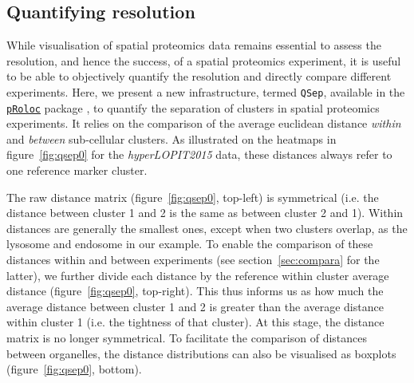 \documentclass[12pt]{article}\usepackage[]{graphicx}\usepackage[]{color}
\newcommand{\Rpackage}[1]{\texttt{#1}}
\newcommand\Biocpkg[1]{%
  {\href{http://bioconductor.org/packages/#1}%
    {\Rpackage{#1}}}}
\begin{document}
\subsection{Quantifying resolution}\label{sec:qsep}

While visualisation of spatial proteomics data remains essential to
assess the resolution, and hence the success, of a spatial proteomics
experiment, it is useful to be able to objectively quantify the
resolution and directly compare different experiments. Here, we
present a new infrastructure, termed \texttt{QSep}, available in the
\Biocpkg{pRoloc} package \citet{Gatto:2014a}, to quantify the
separation of clusters in spatial proteomics experiments. It relies on
the comparison of the average euclidean distance \textit{within} and
\textit{between} sub-cellular clusters. As illustrated on the heatmaps
in figure~\ref{fig:qsep0} for the \textit{hyperLOPIT2015} data, these
distances always refer to one reference marker cluster.

The raw distance matrix (figure~\ref{fig:qsep0}, top-left) is
symmetrical (i.e. the distance between cluster 1 and 2 is the same as
between cluster 2 and 1). Within distances are generally the smallest
ones, except when two clusters overlap, as the lysosome and endosome
in our example. To enable the comparison of these distances within and
between experiments (see section~\ref{sec:compara} for the latter), we
further divide each distance by the reference within cluster average
distance (figure~\ref{fig:qsep0}, top-right). This thus informs us as
how much the average distance between cluster 1 and 2 is greater than
the average distance within cluster 1 (i.e. the tightness of that
cluster). At this stage, the distance matrix is no longer
symmetrical. To facilitate the comparison of distances between
organelles, the distance distributions can also be visualised as
boxplots (figure~\ref{fig:qsep0}, bottom).
\end{document}
